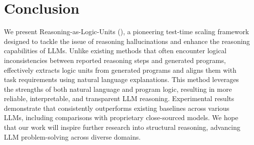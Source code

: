 \section{Conclusion}
We present Reasoning-as-Logic-Units (\tool), a pioneering test-time scaling framework designed to tackle the issue of reasoning hallucinations and enhance the reasoning capabilities of LLMs.
Unlike existing methods that often encounter logical inconsistencies between reported reasoning steps and generated programs, \tool effectively extracts logic units from generated programs and aligns them with task requirements using natural language explanations.
This method leverages the strengths of both natural language and program logic, resulting in more reliable, interpretable, and transparent LLM reasoning.
Experimental results demonstrate that \tool consistently outperforms existing baselines across various LLMs, including comparisons with proprietary close-sourced models.
We hope that our work will inspire further research into structural reasoning, advancing LLM problem-solving across diverse domains.